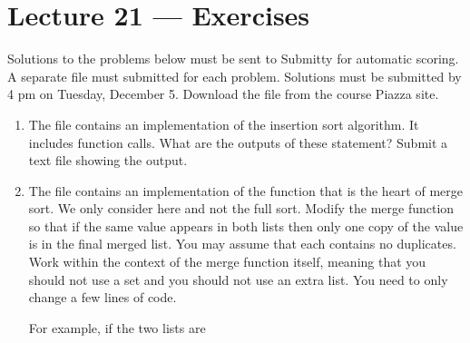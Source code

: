 \documentclass[letterpaper,10pt,english]{sphinxmanual}
\begin{document}
\chapter{Lecture 21 — Exercises}
\label{\detokenize{lecture_notes/lec21_sorting_exercises/exercises:lecture-21-exercises}}\label{\detokenize{lecture_notes/lec21_sorting_exercises/exercises::doc}}
Solutions to the problems below must be sent to Submitty for
automatic scoring.  A separate file must submitted for each problem.
Solutions must be submitted by 4 pm on Tuesday, December 5.  Download
the file  from the course Piazza site.
\begin{enumerate}
\item {} 
The file  contains an implementation of the
insertion sort algorithm.  It includes  function calls.
What are the outputs of these statement?  Submit a text file
showing the output.

\item {} 
The file  contains an implementation of the
 function that is the heart of merge sort.  We only
consider  here and not the full sort.  Modify the merge
function so that if the same value appears in both lists then only
one copy of the value is in the final merged list.  You may assume
that each contains no duplicates.  Work within the context of the
merge function itself, meaning that you should not use a set and
you should not use an extra list.  You need to only change a few
lines of code.

For example, if the two lists are

%
\begin{sphinxVerbatim}[commandchars=\\\{\}]
  \PYG{p}{[}         \PYG{p}{]}
  \PYG{p}{[}            \PYG{p}{]}
\end{sphinxVerbatim}


\end{enumerate}
\end{document}
